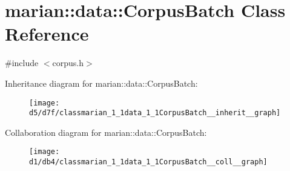 \hypertarget{classmarian_1_1data_1_1CorpusBatch}{}\section{marian\+:\+:data\+:\+:Corpus\+Batch Class Reference}
\label{classmarian_1_1data_1_1CorpusBatch}


{\ttfamily \#include $<$corpus.\+h$>$}



Inheritance diagram for marian\+:\+:data\+:\+:Corpus\+Batch\+:
\nopagebreak
\begin{figure}[H]
\begin{center}
\leavevmode
\texttt{[image: d5/d7f/classmarian\_1\_1data\_1\_1CorpusBatch\_\_inherit\_\_graph]}
\end{center}
\end{figure}


Collaboration diagram for marian\+:\+:data\+:\+:Corpus\+Batch\+:
\nopagebreak
\begin{figure}[H]
\begin{center}
\leavevmode
\texttt{[image: d1/db4/classmarian\_1\_1data\_1\_1CorpusBatch\_\_coll\_\_graph]}
\end{center}
\end{figure}
